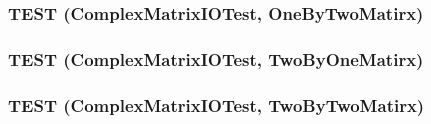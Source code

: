 \subsubsection{\setlength{\rightskip}{0pt plus 5cm}TEST (Complex\-Matrix\-IOTest, One\-By\-Two\-Matirx)}\label{binaryIO__test_8cpp_5805081bb6a01b4986ef5c42b21af5c3}


\subsubsection{\setlength{\rightskip}{0pt plus 5cm}TEST (Complex\-Matrix\-IOTest, Two\-By\-One\-Matirx)}\label{binaryIO__test_8cpp_2f3d171659901abbab448cc4dae203bd}


\subsubsection{\setlength{\rightskip}{0pt plus 5cm}TEST (Complex\-Matrix\-IOTest, Two\-By\-Two\-Matirx)}\label{binaryIO__test_8cpp_1b40f72ed498544f0bbbd73839b2e1b3}



